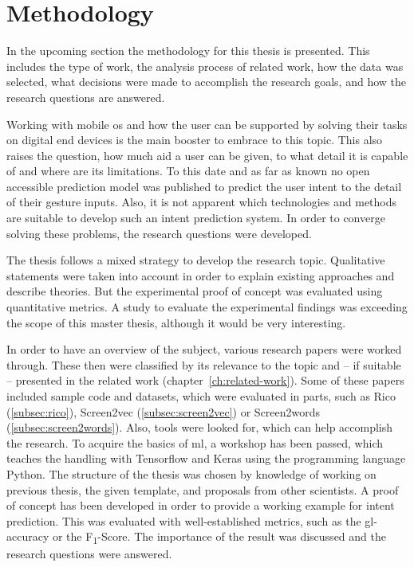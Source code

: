 \chapter{Methodology}

In the upcoming section the methodology for this thesis is presented.
This includes the type of work,
the analysis process of related work,
how the data was selected,
what decisions were made to accomplish the research goals,
and how the research questions are answered.


Working with mobile \gls{os} and how the user can be supported by solving their tasks on digital end devices is the main booster to embrace to this topic.
This also raises the question, how much aid a user can be given, to what detail it is capable of and where are its limitations.
To this date and as far as known no open accessible prediction model was published to predict the user intent to the detail of their gesture inputs.
Also, it is not apparent which technologies and methods are suitable to develop such an intent prediction system.
In order to converge solving these problems, the research questions were developed.


The thesis follows a mixed strategy to develop the research topic.
Qualitative statements were taken into account in order to explain existing approaches and describe theories.
But the experimental proof of concept was evaluated using quantitative metrics.
A study to evaluate the experimental findings was exceeding the scope of this master thesis, although it would be very interesting.


In order to have an overview of the subject, various research papers were worked through.
These then were classified by its relevance to the topic and -- if suitable -- presented in the related work (chapter~\ref{ch:related-work}).
Some of these papers included sample code and datasets, which were evaluated in parts, such as Rico (\ref{subsec:rico}), Screen2vec (\ref{subsec:screen2vec}) or Screen2words (\ref{subsec:screen2words}).
Also, tools were looked for, which can help accomplish the research.
To acquire the basics of \gls{ml}, a workshop has been passed, which teaches the handling with Tensorflow and Keras using the programming language Python.
The structure of the thesis was chosen by knowledge of working on previous thesis, the given template, and proposals from other scientists.
A proof of concept has been developed in order to provide a working example for intent prediction.
This was evaluated with well-established metrics, such as the \gls{gl-accuracy} or the F\textsubscript{1}-Score.
The importance of the result was discussed and the research questions were answered.


